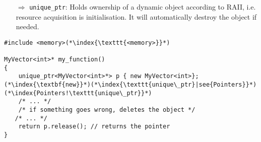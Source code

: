 \documentclass[10pt]{article}
\begin{document}
\begin{enumerate}
\item[$\Rightarrow$] \texttt{unique\_ptr}:
Holds ownership of a dynamic object according to RAII, i.e. resource acquisition is initialisation. It will 
automatically destroy the object if needed.
\end{enumerate}
\begin{lstlisting}
#include <memory>(*\index{\texttt{<memory>}}*)

MyVector<int>* my_function()
{
    unique_ptr<MyVector<int>*> p { new MyVector<int>};(*\index{\textbf{new}}*)(*\index{\texttt{unique\_ptr}|see{Pointers}}*)(*\index{Pointers!\texttt{unique\_ptr}}*)
    /* ... */
    /* if something goes wrong, deletes the object */
   /* ... */   
    return p.release(); // returns the pointer
}
\end{lstlisting}
%
%
\end{document}
